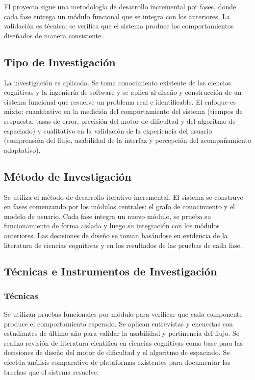 \documentclass{univalle-perfil}
\begin{document}
El proyecto sigue una metodología de desarrollo incremental por fases, donde cada fase entrega un módulo funcional que se integra con los anteriores. La validación es técnica: se verifica que el sistema produce los comportamientos diseñados de manera consistente.

\subsection{Tipo de Investigación}

La investigación es aplicada. Se toma conocimiento existente de las ciencias cognitivas y la ingeniería de software y se aplica al diseño y construcción de un sistema funcional que resuelve un problema real e identificable. El enfoque es mixto: cuantitativo en la medición del comportamiento del sistema (tiempos de respuesta, tasas de error, precisión del motor de dificultad y del algoritmo de espaciado) y cualitativo en la validación de la experiencia del usuario (comprensión del flujo, usabilidad de la interfaz y percepción del acompañamiento adaptativo).

\subsection{Método de Investigación}

Se utiliza el método de desarrollo iterativo incremental. El sistema se construye en fases comenzando por los módulos centrales: el grafo de conocimiento y el modelo de usuario. Cada fase integra un nuevo módulo, se prueba su funcionamiento de forma aislada y luego su integración con los módulos anteriores. Las decisiones de diseño se toman basándose en evidencia de la literatura de ciencias cognitivas y en los resultados de las pruebas de cada fase.

\subsection{Técnicas e Instrumentos de Investigación}

\subsubsection{Técnicas}

Se utilizan pruebas funcionales por módulo para verificar que cada componente produce el comportamiento esperado. Se aplican entrevistas y encuestas con estudiantes de último año para validar la usabilidad y pertinencia del flujo. Se realiza revisión de literatura científica en ciencias cognitivas como base para las decisiones de diseño del motor de dificultad y el algoritmo de espaciado. Se efectúa análisis comparativo de plataformas existentes para documentar las brechas que el sistema resuelve.
\end{document}
